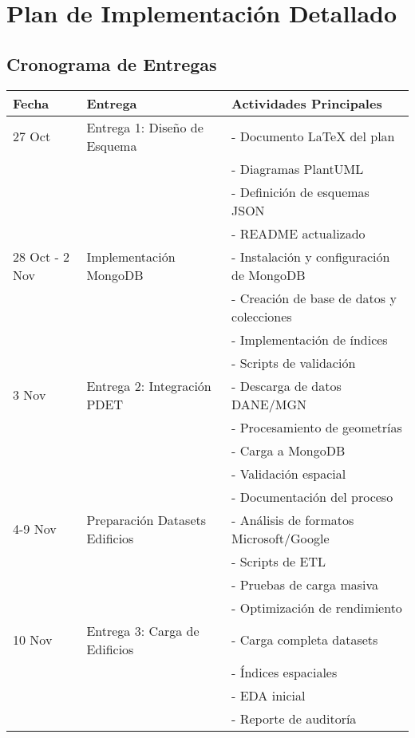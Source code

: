 \documentclass[12pt,a4paper]{article}
\begin{document}
\newpage
\section{Plan de Implementación Detallado}

\subsection{Cronograma de Entregas}

\begin{longtable}{@{}p{}p{}p{}@{}}
\toprule
\textbf{Fecha} & \textbf{Entrega} & \textbf{Actividades Principales} \\ \midrule
\endhead

27 Oct & Entrega 1: Diseño de Esquema & 
- Documento LaTeX del plan \\
& & - Diagramas PlantUML \\
& & - Definición de esquemas JSON \\
& & - README actualizado \\ \midrule

28 Oct - 2 Nov & Implementación MongoDB & 
- Instalación y configuración de MongoDB \\
& & - Creación de base de datos y colecciones \\
& & - Implementación de índices \\
& & - Scripts de validación \\ \midrule

3 Nov & Entrega 2: Integración PDET & 
- Descarga de datos DANE/MGN \\
& & - Procesamiento de geometrías \\
& & - Carga a MongoDB \\
& & - Validación espacial \\
& & - Documentación del proceso \\ \midrule

4-9 Nov & Preparación Datasets Edificios & 
- Análisis de formatos Microsoft/Google \\
& & - Scripts de ETL \\
& & - Pruebas de carga masiva \\
& & - Optimización de rendimiento \\ \midrule

10 Nov & Entrega 3: Carga de Edificios & 
- Carga completa datasets \\
& & - Índices espaciales \\
& & - EDA inicial \\
& & - Reporte de auditoría \\ \midrule


\end{longtable}
\end{document}
